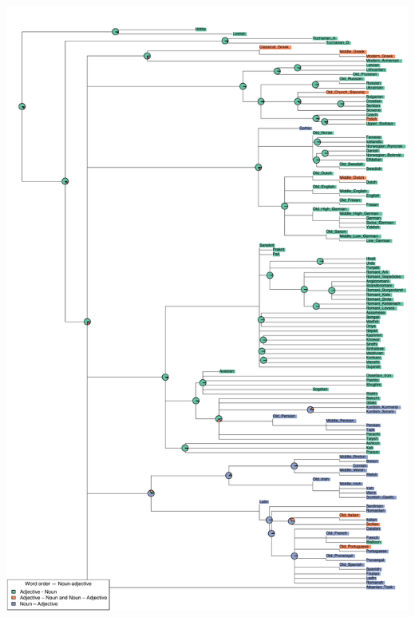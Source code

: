 \includegraphics[width=.9\linewidth]{supp-graphics/WordorderNounadjectiveANWordorderNounadjectiveNA.pdf}

